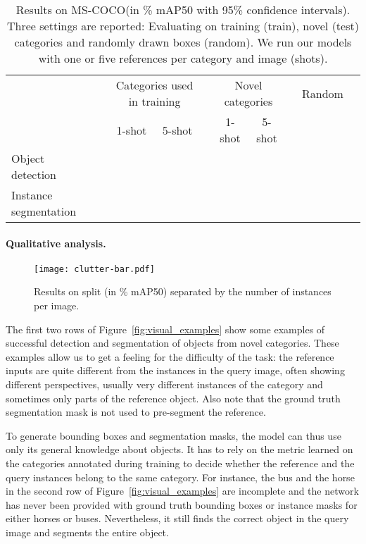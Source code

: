 \documentclass{article}
\newcommand{\coco}{MS-COCO\xspace}
\begin{document}
\begin{table}[t]
\begin{center}
\begin{small}
\begin{tabular}{lccccccccc}
& \hspace{5pt} & \multicolumn{2}{c}{Categories used in training} & \hspace{5pt} & \multicolumn{2}{c}{Novel categories} & \hspace{5pt} & Random \\
& & 1-shot & 5-shot & & 1-shot & 5-shot & &\\
\hline\hline
Object detection & &  &  & &  &  & &  \\
Instance segmentation & &  &  & &  &  & & 
\end{tabular}
\end{small}
\end{center}
\caption{Results on \coco (in \% mAP50 with 95\% confidence intervals). Three settings are reported: Evaluating on training (train), novel (test) categories and randomly drawn boxes (random). We run our models with one or five references per category and image (shots).}
\label{table:results_one_shot}
\end{table}

\paragraph{Qualitative analysis.}

\begin{wrapfigure}[15]{r}{0.25\textwidth}
    \centering
    \texttt{[image: clutter-bar.pdf]}
    \vspace{-0.5cm}
    \caption{Results on split  (in \% mAP50) separated by the number of instances per image.}
    \label{fig:clutter-results}
\end{wrapfigure}

The first two rows of Figure~\ref{fig:visual_examples} show some examples of successful detection and segmentation of objects from novel categories. These examples allow us to get a feeling for the difficulty of the task: the reference inputs are quite different from the instances in the query image, often showing different perspectives, usually very different instances of the category and sometimes only parts of the reference object. Also note that the ground truth segmentation mask is not used to pre-segment the reference.

To generate bounding boxes and segmentation masks, the model can thus use only its general knowledge about objects. It has to rely on the metric learned on the categories annotated during training to decide whether the reference and the query instances belong to the same category. For instance, the bus and the horse in the second row of Figure~\ref{fig:visual_examples} are incomplete and the network has never been provided with ground truth bounding boxes or instance masks for either horses or buses. Nevertheless, it still finds the correct object in the query image and segments the entire object.
\end{document}
